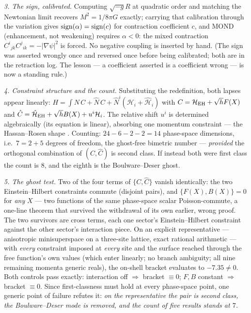 \documentclass[aps,prd,twocolumn,10pt,nofootinbib,superscriptaddress]{revtex4-2}
\begin{document}
\emph{3. The sign, calibrated.} Computing $\sqrt{-g}R$ at quadratic order and matching the
Newtonian limit recovers $M^2=1/8\pi G$ exactly; carrying that calibration through the
variation gives ${\rm sign}(\alpha)={\rm sign}(c)$ for contraction coefficient $c$, and MOND
(enhancement, not weakening) requires $\alpha<0$: the mixed contraction
$C^i{}_{jk}C^j{}_{ik}=-|\nabla\psi|^2$ is forced. No negative coupling is inserted by hand.
(The sign was asserted wrongly once and reversed once before being calibrated; both are in the
retraction log. The lesson --- a coefficient asserted is a coefficient wrong --- is now a
standing rule.)

\emph{4. Constraint structure and the count.} Substituting the redefinition, both lapses appear
linearly: $H=\int N\,C+\hat N\,\hat C+\hat N^i(\mathcal H_i+\hat{\mathcal H}_i)$ with
$C=\mathcal H_{\rm EH}+\sqrt hF(X)$ and $\hat C=\hat{\mathcal H}_{\rm EH}+\sqrt hB(X)+u^i\mathcal
H_i$. The relative shift $u^i$ is determined algebraically (its equation is linear), absorbing
one momentum constraint --- the Hassan--Rosen shape \cite{HR}. Counting: $24-6-2-2=14$ phase-space
dimensions, i.e.\ $7=2+5$ degrees of freedom, the ghost-free bimetric number --- \emph{provided}
the orthogonal combination of $(C,\hat C)$ is second class. If instead both were first class the
count is $8$, and the eighth is the Boulware--Deser ghost.

\emph{5. The ghost test.} Two of the four terms of $\{C,\hat C\}$ vanish identically: the two
Einstein--Hilbert constraints commute (disjoint pairs), and $\{F(X),B(X)\}=0$ for \emph{any}
$X$ --- two functions of the same phase-space scalar Poisson-commute, a one-line theorem that
survived the withdrawal of its own earlier, wrong proof. The two survivors are cross terms,
each one sector's Einstein--Hilbert constraint against the other sector's interaction piece. On
an explicit representative --- anisotropic minisuperspace on a three-site lattice, exact
rational arithmetic --- with \emph{every} constraint imposed at \emph{every} site and the
surface reached through the free function's own values (which enter linearly; no branch
ambiguity; all nine remaining momenta generic reals), the on-shell bracket evaluates to
$-7.35\neq0$. Both controls pass exactly: interaction off $\Rightarrow$ bracket $\equiv0$;
$F,B$ constant $\Rightarrow$ bracket $\equiv0$. Since first-classness must hold at every
phase-space point, one generic point of failure refutes it: \emph{on the representative the
pair is second class, the Boulware--Deser mode is removed, and the count of five results
stands at $7$.}
\end{document}
